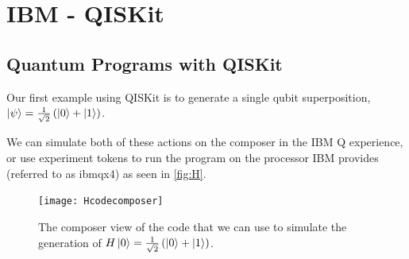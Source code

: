 \section{IBM - QISKit}

\subsection{Quantum Programs with QISKit}

Our first example using QISKit is to generate a single qubit superposition, $\left\vert{\psi}\right\rangle=\frac{1}{\sqrt{2}} \left(\left\vert{0}\right\rangle+\left\vert{1}\right\rangle\right)$.

We can simulate both of these actions on the composer in the IBM Q experience, or use experiment tokens to run the program on the processor IBM provides (referred to as ibmqx4) as seen in \autoref{fig:H}. 

\begin{figure}[h!]
    \centering
    \texttt{[image: Hcodecomposer]}
    \caption{The composer view of the code that we can use to simulate the generation of $H\left\vert{0}\right\rangle=\frac{1}{\sqrt{2}}\left(\left\vert{0}\right\rangle+\left\vert{1}\right\rangle\right)$.}
    \label{fig:H}
\end{figure}

